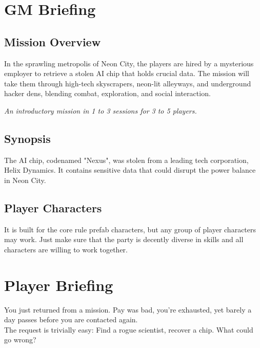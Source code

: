 \chapter{GM Briefing}
\section{Mission Overview}
In the sprawling metropolis of Neon City,
the players are hired by a mysterious employer to retrieve a stolen AI chip that holds crucial data.
The mission will take them through high-tech skyscrapers,
neon-lit alleyways, and underground hacker dens,
blending combat, exploration, and social interaction.
\par
\emph{An introductory mission in 1 to 3 sessions for 3 to 5 players.}
\section{Synopsis}
The AI chip, codenamed "Nexus", was stolen from a leading tech corporation, Helix Dynamics.
It contains sensitive data that could disrupt the power balance in Neon City.
\section{Player Characters}
It is built for the core rule prefab characters,
but any group of player characters may work.
Just make sure that the party is decently diverse in skills
and all characters are willing to work together.

\chapter{Player Briefing}
You just returned from a mission.
Pay was bad, you're exhausted,
yet barely a day passes before you are contacted again.
\\%
The request is trivially easy:
Find a rogue scientist, recover a chip.
What could go wrong?
